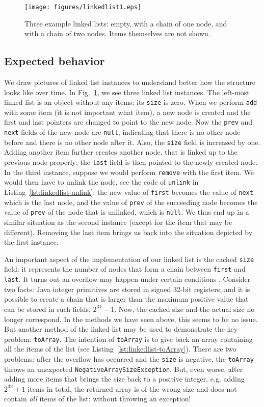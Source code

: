 \documentclass[runningheads]{llncs}
\begin{document}
\begin{figure}
  \centering
  \texttt{[image: figures/linkedlist1.eps]}
  \caption{Three example linked lists: empty, with a chain of one node, and with a chain of two nodes. Items themselves are not shown.}
  \label{fig:linkedlist}
\end{figure}

\subsection{Expected behavior}

We draw pictures of linked list instances to understand better how the structure looks like over time. In Fig.~\ref{fig:linkedlist}, we see three linked list instances. The left-most linked list is an object without any items: its \texttt{size} is zero. When we perform \texttt{add} with some item (it is not important what item), a new node is created and the first and last pointers are changed to point to the new node. Now the \texttt{prev} and \texttt{next} fields of the new node are \texttt{null}, indicating that there is no other node before and there is no other node after it. Also, the \texttt{size} field is increased by one. Adding another item further creates another node, that is linked up to the previous node properly; the \texttt{last} field is then pointed to the newly created node.
In the third instance, suppose we would perform \texttt{remove} with the first item. We would then have to unlink the node, see the code of \texttt{unlink} in Listing~\ref{lst:linkedlist-unlink}: the new value of \texttt{first} becomes the value of \texttt{next} which is the last node, and the value of \texttt{prev} of the succeeding node becomes the value of \texttt{prev} of the node that is unlinked, which is \texttt{null}. We thus end up in a similar situation as the second instance (except for the item that may be different). Removing the last item brings us back into the situation depicted by the first instance.

An important aspect of the implementation of our linked list is the cached \texttt{size} field: it represents the number of nodes that form a chain between \texttt{first} and \texttt{last}. It turns out an overflow may happen under certain conditions . Consider two facts: Java integer primitives are stored in signed 32-bit registers, and it is possible to create a chain that is larger than the maximum positive value that can be stored in such fields, $2^{31}-1$. Now, the cached size and the actual size no longer correspond. In the methods we have seen above, this seems to be no issue. But another method of the linked list may be used to demonstrate the key problem: \texttt{toArray}. The intention of \texttt{toArray} is to give back an array containing all the items of the list (see Listing~\ref{lst:linkedlist-toArray}). There are two problems: after the overflow has occurred and the \texttt{size} is negative, the \texttt{toArray} throws an unexpected \texttt{NegativeArraySizeException}. But, even worse, after adding more items that brings the size back to a positive integer, e.g. adding $2^{32}+1$ items in total, the returned array is of the wrong size and does not contain \emph{all} items of the list: without throwing an exception!
\end{document}

